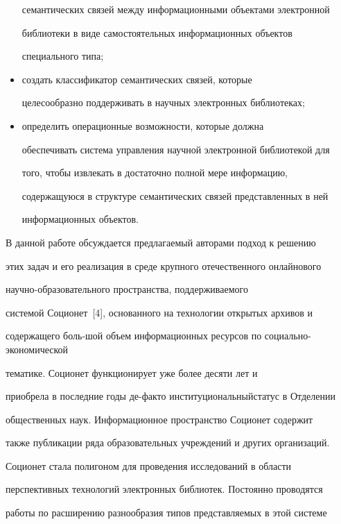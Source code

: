 \begin{multicols}{2}
\begin{itemize}
семантических связей между информационными объектами электронной 


библиотеки в виде самостоятельных информационных объектов 


специального типа;


\item создать классификатор семантических связей, которые 


целесообразно поддерживать в научных электронных библиотеках;


\item определить операционные возможности, которые должна 


обеспечивать система управления научной электронной библиотекой для 


того, чтобы извлекать в достаточно полной мере информацию, 


содержащуюся в структуре семантических связей представленных в ней 


информационных объектов. 


\end{itemize}





     В данной работе обсуждается предлагаемый авторами подход к решению 


этих задач и его реализация в среде крупного отечественного онлайнового 


     на\-уч\-но-об\-ра\-зо\-ва\-тель\-но\-го пространства, поддерживаемого 


системой Соционет~[4], основанного на технологии открытых архивов и 


содержащего боль-\linebreak шой объем информационных ресурсов по со\-ци\-ально-эко\-но\-ми\-че\-ской 


тематике. Соционет функ\-ци\-о\-нирует уже более десяти лет и 


приобрела в послед\-ние годы де-фак\-то институциональный\linebreak статус в Отделении 


общественных наук. Информационное пространство Соционет содержит 


также публикации ряда образовательных учреждений и \mbox{других} организаций. 


Соционет стала полигоном для проведения исследований в области 


перспективных технологий электронных библиотек. Постоянно проводятся 


работы по расширению разнообразия типов представляемых в этой системе 



\end{multicols}
